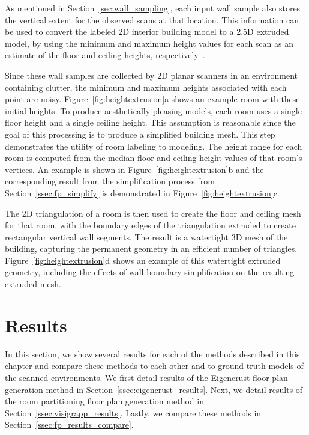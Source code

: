 \documentclass[12pt,onecolumn,oneside]{book}
\begin{document}
As mentioned in Section~\ref{sec:wall_sampling}, each input wall sample also stores the vertical extent for the observed scans at that location.  This information can be used to convert the labeled 2D interior building model to a 2.5D extruded model, by using the minimum and maximum height values for each scan as an estimate of the floor and ceiling heights, respectively~\cite{Turner14}.

Since these wall samples are collected by 2D planar scanners in an environment containing clutter, the minimum and maximum heights associated with each point are noisy.  Figure~\ref{fig:heightextrusion}a shows an example room with these initial heights.  To produce aesthetically pleasing models, each room uses a single floor height and a single ceiling height.  This assumption is reasonable since the goal of this processing is to produce a simplified building mesh.  This step demonstrates the utility of room labeling to modeling.  The height range for each room is computed from the median floor and ceiling height values of that room's vertices.  An example is shown in Figure~\ref{fig:heightextrusion}b and the corresponding result from the simplification process from Section~\ref{ssec:fp_simplify} is demonstrated in Figure~\ref{fig:heightextrusion}c.

The 2D triangulation of a room is then used to create the floor and ceiling mesh for that room, with the boundary edges of the triangulation extruded to create rectangular vertical wall segments.  The result is a watertight 3D mesh of the building, capturing the permanent geometry in an efficient number of triangles.  Figure~\ref{fig:heightextrusion}d shows an example of this watertight extruded geometry, including the effects of wall boundary simplification on the resulting extruded mesh.

\section{Results}
\label{sec:fp_results}

In this section, we show several results for each of the methods described in this chapter and compare these methods to each other and to ground truth models of the scanned environments.  We first detail results of the Eigencrust floor plan generation method in Section~\ref{ssec:eigencrust_results}.  Next, we detail results of the room partitioning floor plan generation method in Section~\ref{ssec:visigrapp_results}.  Lastly, we compare these methods in Section~\ref{ssec:fp_results_compare}.
\end{document}
